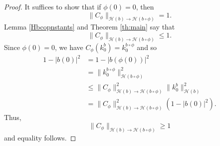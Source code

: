 \documentclass[11pt]{amsart}
\def\C{{\mathbb{C}}}
\def\HH{{\mathcal H}}
\renewcommand{\leq}{\leqslant}
\renewcommand{\geq}{\geqslant}
\renewcommand{\subset}{\subseteq}
\numberwithin{equation}{section}
\theoremstyle{plain}
\theoremstyle{definition}
\begin{document}
\begin{proof}
It suffices to show that if $\phi(0) = 0$, then  $$\|C_{\phi}\|_{\HH(b) \to \HH(b \circ \phi)} = 1.$$ Lemma \ref{Hbcopnstants} and Theorem \ref{th:main} say that 
$$\|C_{\phi}\|_{\HH(b) \to \HH(b \circ \phi)} \leq 1.$$
Since $\phi(0) = 0$, we have 
$C_{\phi}(k_{0}^{b}) = k_{0}^{b \circ \phi}$
and so 
\begin{align*}
    1 - |b(0)|^2 & = 1 - |b(\phi(0))|^2\\
    & = \|k_{0}^{b \circ \phi}\|^2_{\HH(b \circ \phi)}\\
    & \leq \|C_{\phi}\|^{2}_{\HH(b) \to \HH(b \circ \phi)} \|k_{0}^{b}\|^2_{\HH(b)}\\
    & = \|C_{\phi}\|^{2}_{\HH(b) \to \HH(b \circ \phi)} (1 - |b(0)|^2).
\end{align*}
Thus, $$\|C_{\phi}\|_{\HH(b) \to \HH(b \circ \phi)} \geq 1$$ and equality follows. 
\end{proof}
\end{document}
